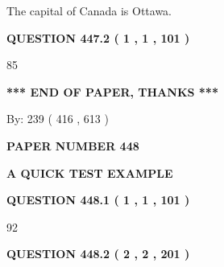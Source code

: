 \documentclass[12pt]{article}
\begin{document}
 
The capital of Canada is Ottawa.
 
 
 
 
  
\vspace{0.2in}
  
{\textbf{\Large{QUESTION
447.2 
 ( 1 , 1 , 101 )
}}}
  
  
 
 
\noindent{}

85
 
 
   
   
 \vspace{0.2in}
 
   
   
   
   
\vspace{1.0in} 
{\textbf{\large{ *** END OF PAPER, THANKS *** }}} 
   
   
\hspace{1.0in} By: 
 239 ( 416 ,  613 )
   
   
   
   
\newpage 
\setcounter{page}{ 
   448001 } 
   
   
   
   
 {\textbf{ \Large{ PAPER NUMBER  448  }}}
   
   
\vspace{0.2in}
   
   
   
   
   
   
 \vspace{0.2in}
{\LARGE {\textbf{ A QUICK TEST EXAMPLE}}}
   
   
  
\vspace{0.2in}
  
{\textbf{\Large{QUESTION
448.1 
 ( 1 , 1 , 101 )
}}}
  
  
 
 
\noindent{}

92
 
 
  
\vspace{0.2in}
  
{\textbf{\Large{QUESTION
448.2 
 ( 2 , 2 , 201 )
}}}
  
\end{document}
